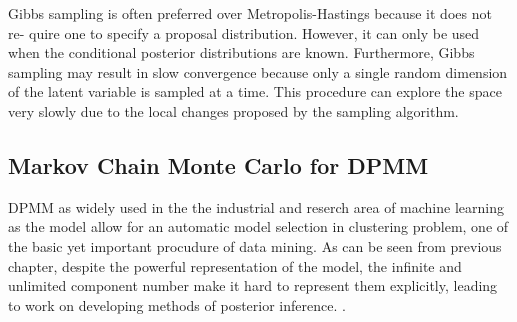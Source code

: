 \begin{itemize}
		 Gibbs sampling is often preferred over Metropolis-Hastings because it does not re-
		 quire one to specify a proposal distribution. However, it can only be used when the
		 conditional posterior distributions are known. Furthermore, Gibbs sampling may result in slow convergence because only a single random dimension of the latent variable is sampled at a time. This procedure can explore the space very slowly due to the local changes proposed by the sampling algorithm.
		 
	\end{itemize}
	
	\subsection{Markov Chain Monte Carlo for DPMM}
	
	 DPMM as widely used in the the industrial and reserch area of machine learning as the model allow for an automatic model selection in clustering problem, one of the basic yet important procudure of data mining. As can be seen from previous chapter, despite the powerful representation of the model, the infinite and unlimited component number make it hard to represent them explicitly, leading to work on developing methods of posterior inference. . 
	 
